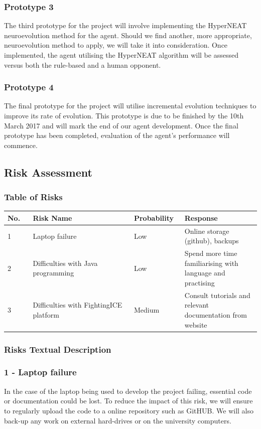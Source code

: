 \documentclass[11pt,a4paper]{article}
\begin{document}
\subsubsection*{Prototype 3}
The third prototype for the project will involve implementing the HyperNEAT neuroevolution method for the agent. Should we find another, more appropriate, neuroevolution method to apply, we will take it into consideration. Once implemented, the agent utilising the HyperNEAT algorithm will be assessed versus both the rule-based and a human opponent.

\subsubsection*{Prototype 4}
The final prototype for the project will utilise incremental evolution techniques to improve its rate of evolution. This prototype is due to be finished by the 10th March 2017 and will mark the end of our agent development. Once the final prototype has been completed, evaluation of the agent's performance will commence.
\newpage
\subsection{Risk Assessment}
\subsubsection{Table of Risks}
\begin{tabular}{|p{0.1\linewidth}|p{0.4\linewidth}|p{0.2\linewidth}|p{0.3\linewidth}|}
\hline
No. & Risk Name & Probability & Response\\ \hline
1 & Laptop failure & Low & Online storage (github), backups\\ \hline
2 & Difficulties with Java programming & Low & Spend more time familiarising with language and practising\\ \hline
3 & Difficulties with FightingICE platform & Medium & Consult tutorials and relevant documentation from website\\ \hline
\end{tabular}
\subsubsection{Risks Textual Description}
\subsubsection*{1 - Laptop failure}
In the case of the laptop being used to develop the project failing, essential code or documentation could be lost. To reduce the impact of this risk, we will ensure to regularly upload the code to a online repository such as GitHUB. We will also back-up any work on external hard-drives or on the university computers.
\end{document}
